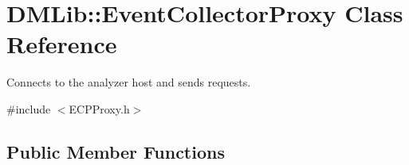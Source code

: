 \hypertarget{class_d_m_lib_1_1_event_collector_proxy}{\section{D\-M\-Lib\-:\-:Event\-Collector\-Proxy Class Reference}
\label{class_d_m_lib_1_1_event_collector_proxy}
}


Connects to the analyzer host and sends requests.  




{\ttfamily \#include $<$E\-C\-P\-Proxy.\-h$>$}

\subsection*{Public Member Functions}
